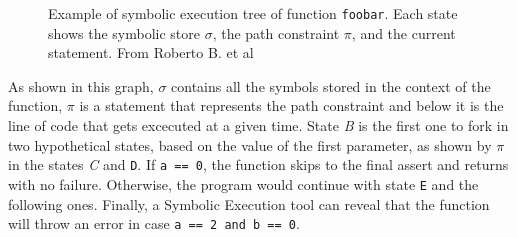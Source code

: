 \begin{figure}[H]
{%
}
\caption{Example of symbolic execution tree of function \texttt{foobar}. Each state shows the symbolic store $\sigma$, the path constraint $\pi$, and the current statement. From Roberto B. et al\cite{symbolicExecutionDef}}
\end{figure}

As shown in this graph, $\sigma$ contains all the symbols stored in the context of the function, $\pi$ is a statement that represents the path constraint and below it is the line of code that gets excecuted at a given time. State \textit{B} is the first one to fork in two hypothetical states, based on the value of the first parameter, as shown by $\pi$ in the states \textit{C} and \texttt{D}. If \texttt{a == 0}, the function skips to the final assert and returns with no failure. Otherwise, the program would continue with state \texttt{E} and the following ones. Finally, a Symbolic Execution tool can reveal that the function will throw an error in case \texttt{a == 2 and b == 0}.

